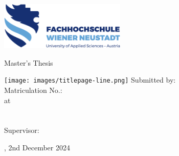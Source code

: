 
\makeatletter

\begin{titlepage}

	\includegraphics[width=6cm]{images/fhwn-logo-neu-ohneSchutzraum.png}

	\begin{sffamily}
		\vspace{70pt}
		{\noindent \linespread{1.3} \color{header-blue} \Huge \textbf{\@title} \par }
		\vspace{10pt}
		{\noindent\Large Master's Thesis \par}
		\vspace{15pt}
		\hspace{-35mm}
		\texttt{[image: images/titlepage-line.png]}
		\vspace{15pt}
		\tabto{2cm}Submitted by:\tabto{7cm}\textbf{\@author} \\
		\tabto{2cm}Matriculation No.:\tabto{7cm}\textbf{\matriculationNumber} \\
		\vspace{15pt}
		\tabto{2cm}at\tabto{7cm}\textbf{\study}\\
		\tabto{7cm}\textbf{\studyprogram}\\
		\tabto{7cm}\textbf{\masterdescription}\\
		\vspace{15pt}
		\tabto{2cm}Supervisor:\tabto{7cm}\textbf{\advisor}

		\vfill

		\place, 2nd December 2024 %
	\end{sffamily}

\end{titlepage}

\makeatother

